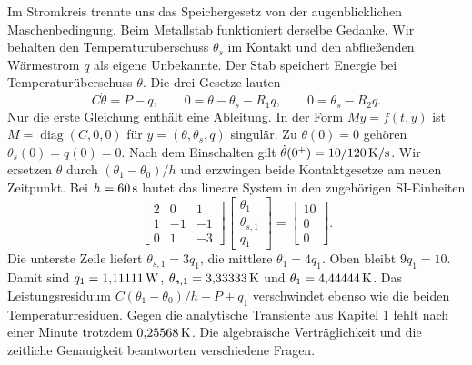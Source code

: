 Im Stromkreis trennte uns das Speichergesetz von der augenblicklichen Maschenbedingung. Beim Metallstab funktioniert derselbe Gedanke. Wir behalten den Temperaturüberschuss \(\theta_s\) im Kontakt und den abfließenden Wärmestrom \(q\) als eigene Unbekannte. Der Stab speichert Energie bei Temperaturüberschuss \(\theta\). Die drei Gesetze lauten
\[
 C\dot\theta=P-q,\qquad 0=\theta-\theta_s-R_1q,\qquad
 0=\theta_s-R_2q .
\]
Nur die erste Gleichung enthält eine Ableitung. In der Form \(M\dot y=f(t,y)\) ist \(M=\operatorname{diag}(C,0,0)\) für \(y=(\theta,\theta_s,q)\) singulär. Zu \(\theta(0)=0\) gehören \(\theta_s(0)=q(0)=0\). Nach dem Einschalten gilt \(\dot\theta(0^+)=10/120\,\mathrm{K/s}\).
Wir ersetzen \(\dot\theta\) durch \((\theta_1-\theta_0)/h\) und erzwingen beide Kontaktgesetze am neuen Zeitpunkt. Bei \(h=60\,\mathrm{s}\) lautet das lineare System in den zugehörigen SI-Einheiten
\[
 \begin{bmatrix}2&0&1\\1&-1&-1\\0&1&-3\end{bmatrix}
 \begin{bmatrix}\theta_1\\\theta_{s,1}\\q_1\end{bmatrix}
 =\begin{bmatrix}10\\0\\0\end{bmatrix}.
\]
Die unterste Zeile liefert \(\theta_{s,1}=3q_1\), die mittlere \(\theta_1=4q_1\). Oben bleibt \(9q_1=10\). Damit sind \(q_1=1{,}11111\,\mathrm{W}\), \(\theta_{s,1}=3{,}33333\,\mathrm{K}\) und \(\theta_1=4{,}44444\,\mathrm{K}\).
Das Leistungsresiduum \(C(\theta_1-\theta_0)/h-P+q_1\) verschwindet ebenso wie die beiden Temperaturresiduen. Gegen die analytische Transiente aus Kapitel 1 fehlt nach einer Minute trotzdem \(0{,}25568\,\mathrm{K}\). Die algebraische Verträglichkeit und die zeitliche Genauigkeit beantworten verschiedene Fragen.

